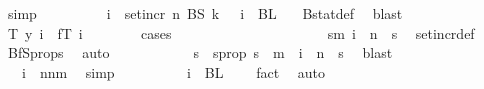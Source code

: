 \begin{isabellebody}
\ simp\isanewline
\ \ \ \ \ \ \isamarkupfalse%
\ \isamarkupfalse%
\ {\isachardoublequoteopen}i\ {\isasymin}\ set{\isacharunderscore}{\kern0pt}incr\ n\ {\isacharparenleft}{\kern0pt}BS\ k{\isacharparenright}{\kern0pt}{\isachardoublequoteclose}\ {\isacharbar}{\kern0pt}\ \ {\isachardoublequoteopen}i\ {\isasymin}\ BL\ {}{\isachardoublequoteclose}\ \isamarkupfalse%
\ Bstat{\isacharunderscore}{\kern0pt}def\ \isamarkupfalse%
\ blast\isanewline
\ \ \ \ \ \ \isamarkupfalse%
\ \isamarkupfalse%
\ {\isachardoublequoteopen}T\ y\ i\ {\isacharequal}{\kern0pt}\ fT\ i{\isachardoublequoteclose}\isanewline
\ \ \ \ \ \ \isamarkupfalse%
\ {\isacharparenleft}{\kern0pt}cases{\isacharparenright}{\kern0pt}\isanewline
\ \ \ \ \ \ \ \ \isamarkupfalse%
\ {}\isanewline
\ \ \ \ \ \ \ \ \isamarkupfalse%
\ \isamarkupfalse%
\ {\isachardoublequoteopen}{\isasymexists}s{\isacharless}{\kern0pt}m{\isachardot}{\kern0pt}\ i\ {\isacharequal}{\kern0pt}\ n\ {\isacharplus}{\kern0pt}\ s{\isachardoublequoteclose}\ \isamarkupfalse%
\ set{\isacharunderscore}{\kern0pt}incr{\isacharunderscore}{\kern0pt}def\ \isamarkupfalse%
\ BfS{\isacharunderscore}{\kern0pt}props{\isacharparenleft}{\kern0pt}{}{\isacharparenright}{\kern0pt}\ \isamarkupfalse%
\ auto\isanewline
\ \ \ \ \ \ \ \ \isamarkupfalse%
\ \isamarkupfalse%
\ s\ \ s{\isacharunderscore}{\kern0pt}prop{\isacharcolon}{\kern0pt}\ {\isachardoublequoteopen}s\ {\isacharless}{\kern0pt}\ m\ {\isasymand}\ i\ {\isacharequal}{\kern0pt}\ n\ {\isacharplus}{\kern0pt}\ s{\isachardoublequoteclose}\ \isamarkupfalse%
\ blast\isanewline
\ \ \ \ \ \ \ \ \isamarkupfalse%
\ \isamarkupfalse%
\ {\isacharasterisk}{\kern0pt}{\isacharcolon}{\kern0pt}\ {\isachardoublequoteopen}\ i\ {\isasymin}\ {\isacharbraceleft}{\kern0pt}n{\isachardot}{\kern0pt}{\isachardot}{\kern0pt}{\isacharless}{\kern0pt}n{\isacharplus}{\kern0pt}m{\isacharbraceright}{\kern0pt}{\isachardoublequoteclose}\ \isamarkupfalse%
\ simp\isanewline
\ \ \ \ \ \ \ \ \isamarkupfalse%
\ {\isachardoublequoteopen}i\ {\isasymnotin}\ BL\ {}{\isachardoublequoteclose}\ \isamarkupfalse%
\ {}\ fact{}\ \isamarkupfalse%
\ auto\isanewline
\ \ \ \ \ \ \ \ \isamarkupfalse%

\end{isabellebody}
